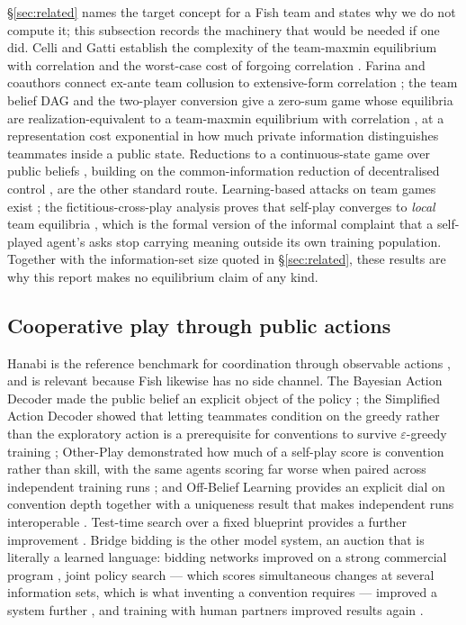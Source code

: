 \documentclass[11pt]{article}
\theoremstyle{definition}
\begin{document}
\S\ref{sec:related} names the target concept for a Fish team and states why we
do not compute it; this subsection records the machinery that would be needed
if one did. Celli and Gatti establish the complexity of the team-maxmin
equilibrium with correlation and the worst-case cost of forgoing correlation
\cite{celli-gatti}. Farina and coauthors connect ex-ante team collusion to
extensive-form correlation \cite{farina-collusion}; the team belief DAG and
the two-player conversion give a zero-sum game whose equilibria are
realization-equivalent to a team-maxmin equilibrium with correlation
\cite{zhang-tbdag,carminati-tpi}, at a representation cost exponential in how
much private information distinguishes teammates inside a public state.
Reductions to a continuous-state game over public beliefs \cite{brown-rebel},
building on the common-information reduction of decentralised control
\cite{nayyar-common}, are the other standard route. Learning-based attacks on
team games exist \cite{mcaleer-teampsro,xu-fxp}; the fictitious-cross-play
analysis proves that self-play converges to \emph{local} team equilibria
\cite{xu-fxp}, which is the formal version of the informal complaint that a
self-played agent's asks stop carrying meaning outside its own training
population. Together with the information-set size quoted in
\S\ref{sec:related}, these results are why this report makes no equilibrium
claim of any kind.

\subsection{Cooperative play through public actions}

Hanabi is the reference benchmark for coordination through observable actions
\cite{bard-hanabi}, and is relevant because Fish likewise has no side channel.
The Bayesian Action Decoder made the public belief an explicit object of the
policy \cite{foerster-bad}; the Simplified Action Decoder showed that letting
teammates condition on the greedy rather than the exploratory action is a
prerequisite for conventions to survive $\varepsilon$-greedy training
\cite{hu-sad}; Other-Play demonstrated how much of a self-play score is
convention rather than skill, with the same agents scoring far worse when
paired across independent training runs \cite{hu-otherplay}; and Off-Belief
Learning provides an explicit dial on convention depth together with a
uniqueness result that makes independent runs interoperable \cite{hu-obl}.
Test-time search over a fixed blueprint provides a further improvement
\cite{lerer-sparta}. Bridge bidding is the other model system, an auction that
is literally a learned language: bidding networks improved on a strong
commercial program \cite{rong-bidding}, joint policy search --- which scores
simultaneous changes at several information sets, which is what inventing a
convention requires --- improved a system further \cite{tian-jps}, and
training with human partners improved results again \cite{lockhart-bidding}.
\end{document}
